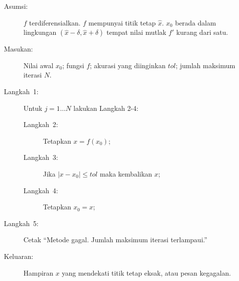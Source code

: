 \begin{pseudocode} 
\begin{description}
\item [{Asumsi:}] $f$ terdiferensialkan. $f$ mempunyai titik tetap $\hat{x}$.
$x_{0}$ berada dalam lingkungan $(\hat{x}-\delta,\hat{x}+\delta)$
tempat nilai mutlak $f'$ kurang dari satu.
\item [{Masukan:}] Nilai awal $x_{0}$; fungsi $f$; akurasi yang diinginkan
$tol$; jumlah maksimum iterasi $N$.
\item [{Langkah~1:}] Untuk $j=1\ldots N$ lakukan Langkah 2-4:

\begin{description}
\item [{Langkah~2:}] Tetapkan $x=f(x_{0})$;
\item [{Langkah~3:}] Jika $|x-x_{0}|\leq tol$ maka kembalikan $x$;
\item [{Langkah~4:}] Tetapkan $x_{0}=x$;
\end{description}
\item [{Langkah~5:}] Cetak ``Metode gagal. Jumlah maksimum iterasi terlampaui.''
\item [{Keluaran:}] Hampiran $x$ yang mendekati titik tetap eksak, atau
pesan kegagalan.
\end{description}
\end{pseudocode}  

